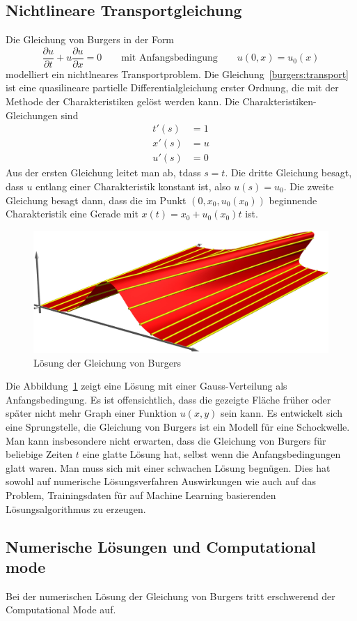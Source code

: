 %
%
%
\subsection{Nichtlineare Transportgleichung}
Die Gleichung von Burgers in der Form
\begin{equation}
\frac{\partial u}{\partial t} + u\frac{\partial u}{\partial x}=0
\qquad\text{mit Anfangsbedingung}\qquad
u(0,x) = u_0(x)
\label{burgers:transport}
\end{equation}
modelliert ein nichtlneares Transportproblem.
Die Gleichung~\eqref{burgers:transport} ist eine quasilineare partielle
Differentialgleichung erster Ordnung, die mit der Methode der
Charakteristiken \cite{burgers:pde} gelöst werden kann.
Die Charakteristiken-Gleichungen sind
\begin{align*}
t'(s)&=1
\\ 
x'(s)&=u
\\
u'(s)&=0
\end{align*}
Aus der ersten Gleichung leitet man ab, tdass $s=t$.
Die dritte Gleichung besagt, dass $u$ entlang einer Charakteristik konstant
ist, also $u(s)=u_0$.
Die zweite Gleichung besagt dann, dass die im Punkt $(0,x_0,u_0(x_0))$
beginnende Charakteristik eine Gerade mit $x(t)=x_0 + u_0(x_0)t$ ist.

\begin{figure}
\centering
\includegraphics{learning/welle.jpg}
\caption{Lösung der Gleichung von Burgers
\label{burgers:charloesung}}
\end{figure}
Die Abbildung~\ref{burgers:charloesung} 
zeigt eine Lösung mit einer Gauss-Verteilung als Anfangsbedingung.
Es ist offensichtlich, dass die gezeigte Fläche früher oder später nicht
mehr Graph einer Funktion $u(x,y)$ sein kann.
Es entwickelt sich eine Sprungstelle, die Gleichung von Burgers ist
ein Modell für eine Schockwelle.
Man kann insbesondere nicht erwarten, dass die Gleichung von Burgers
für beliebige Zeiten $t$ eine glatte Lösung hat, selbst wenn die
Anfangsbedingungen glatt waren.
Man muss sich mit einer schwachen Lösung begnügen.
Dies hat sowohl auf numerische Lösungsverfahren Auswirkungen wie auch
auf das Problem, Trainingsdaten für auf Machine Learning basierenden
Lösungsalgorithmus zu erzeugen.

\subsection{Numerische Lösungen und Computational mode}
Bei der numerischen Lösung der Gleichung von Burgers tritt erschwerend der
Computational Mode auf.


